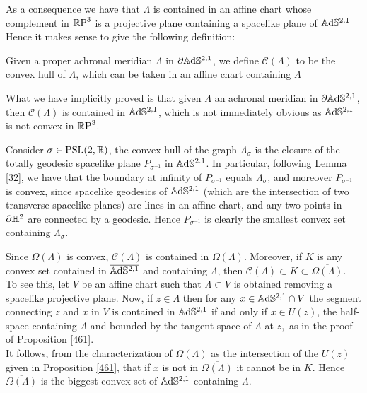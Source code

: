 As a consequence we have that $\Lambda$ is contained in an affine chart whose complement in $\mathbb{R}\text{P}^3$ is a projective plane containing a spacelike plane of $\mathbb{A}\mathrm{d}\mathbb{S}^{2,1}$ Hence it makes sense to give the following definition:

\begin{definition}
    Given a proper achronal meridian $\Lambda$ in $\partial\mathbb{A}\mathrm{d}\mathbb{S}^{2,1}$, we define $\mathcal{C}(\Lambda)$ to be the convex hull of $\Lambda$, which can be taken in an affine chart containing $\Lambda$
\end{definition}

What we have implicitly proved is that given $\Lambda$ an achronal meridian in $\partial\mathbb{A}\mathrm{d}\mathbb{S}^{2,1}$, then $\mathcal{C}(\Lambda)$ is contained in $\mathbb{A}\mathrm{d}\mathbb{S}^{2,1}$, which is not immediately obvious as $\mathbb{A}\mathrm{d}\mathbb{S}^{2,1}$ is not convex in $\mathbb{R}\text{P}^3$. \\

\begin{example}\label{43}
    Consider $\sigma\in\text{PSL}(2,\mathbb{R})$, the convex hull of the graph $\Lambda_\sigma$ is the closure of the totally geodesic spacelike plane $P_{\sigma^{-1}}$ in $\mathbb{A}\mathrm{d}\mathbb{S}^{2.1}$. In particular, following Lemma \ref{32}, we have that the boundary at infinity of $P_{\sigma^{-1}}$ equals $\Lambda_\sigma$, and moreover $P_{\sigma^{-1}}$ is convex, since spacelike geodesics of $\mathbb{A}\mathrm{d}\mathbb{S}^{2,1}$ (which are the intersection of two transverse spacelike planes) are lines in an affine chart, and any two points in $\partial\mathbb{H}^2$ are connected by a geodesic. Hence $P_{\sigma^{-1}}$ is clearly the smallest convex set containing $\Lambda_\sigma$.  
\end{example}

\begin{observation} Since $\Omega(\Lambda)$ is convex, $\mathcal{C}(\Lambda)$ is contained in $\Omega(\Lambda)$. Moreover, if $K$ is any convex set contained in $\overline{\mathbb{A}\mathrm{d}\mathbb{S}^{2,1}}$ and containing $\Lambda$, then $\mathcal{C}(\Lambda)\subset K\subset \overline{\Omega(\Lambda)}.$\\
    To see this, let $V$ be an affine chart such that $\Lambda\subset V$ is obtained removing a spacelike projective plane. Now, if $z\in \Lambda$ then for any $x\in\mathbb{A}\mathrm{d}\mathbb{S}^{2,1}\cap V$ the segment connecting $z$ and $x$ in $V$ is contained in $\mathbb{A}\mathrm{d}\mathbb{S}^{2,1}$ if and only if $x\in U(z)$, the half-space containing $\Lambda$ and bounded by the tangent space of $\Lambda$ at $z,$ as in the proof of Proposition \ref{461}. \\
    It follows, from the characterization of $\Omega(\Lambda)$ as the intersection of the $U(z)$ given in Proposition \ref{461}, that if $x$ is not in $\overline{\Omega(\Lambda)}$ it cannot be in $K$. Hence $\overline{\Omega(\Lambda)}$ is the biggest convex set of $\mathbb{A}\mathrm{d}\mathbb{S}^{2,1}$ containing $\Lambda$.
\end{observation}

